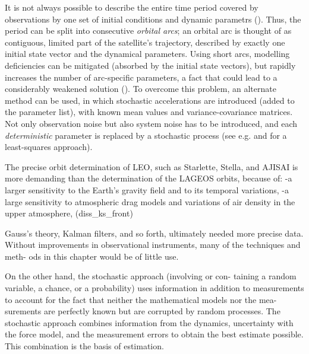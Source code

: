 It is not always possible to describe the entire time period covered by observations 
by one set of initial conditions and dynamic parametrs (\cite{BeutlerVII}). Thus, 
the period can be split into consecutive \emph{orbital arcs}; an orbital arc is 
thought of as contiguous, limited part of the satellite's trajectory, described by 
exactly one initial state vector and the dynamical parameters. Using short arcs, 
modelling deficiencies can be mitigated (absorbed by the initial state vectors), 
but rapidly increases the number of arc-speciﬁc parameters, a fact that could lead 
to a considerably weakened solution (\cite{BeutlerVII}). To overcome this problem, 
an alternate method can be used, in which stochastic accelerations are introduced 
(added to the parameter list), with known mean values and variance-covariance matrices.
Not only observation noise but also system noise has to be introduced, and each 
\emph{deterministic} parameter is replaced by a stochastic process (see e.g. \cite{Jaggi2005b} 
and \cite{Jaggi2005a} for a least-squares approach).

\iffalse
The precise orbit determination of LEO, such as Starlette, Stella, and AJISAI is more
demanding than the determination of the LAGEOS orbits, because of:
-a larger sensitivity to the Earth’s gravity field and to its temporal variations,
-a large sensitivity to atmospheric drag models and variations of air density in the
upper atmosphere, (diss_ks_front)

Gauss’s theory, Kalman filters, and so forth, ultimately needed more precise data.
Without improvements in observational instruments, many of the techniques and meth-
ods in this chapter would be of little use.

On the other hand, the stochastic approach (involving or con-
taining a random variable, a chance, or a probability) uses information in addition to
measurements to account for the fact that neither the mathematical models nor the mea-
surements are perfectly known but are corrupted by random processes. The stochastic
approach combines information from the dynamics, uncertainty with the force model,
and the measurement errors to obtain the best estimate possible. This combination is the
basis of estimation.

